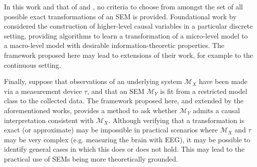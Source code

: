 In this work and that of \cite{beckers2019approximate} and \cite{beckers2019abstracting},
no criteria to choose from amongst the set of all possible exact transformations of an SEM is provided.
Foundational work by \cite{chalupka2015visual,chalupka2016multi} considered the construction of higher-level causal variables in a particular discrete setting,
providing algorithms to learn a transformation of a micro-level model to a macro-level model with desirable information-theoretic properties.
The framework proposed here may lead to extensions of their work, for example to the continuous setting.

Finally, suppose that observations of an underlying system $\mathcal{M}_X$ have been made via a measurement device $\tau$, and that an SEM $\mathcal{M}_Y$ is fit from a restricted model class to the collected data.
The framework proposed here, and extended by the aforementioned works, provides a method to ask whether $\mathcal{M}_Y$ admits a causal interpretation consistent with $\mathcal{M}_X$.
Although verifying that a transformation is exact (or approximate) may be impossible in practical scenarios where $\mathcal{M}_X$ and $\tau$ may be very complex (e.g. measuring the brain with EEG), it may be possible to identify general cases in which this does or does not hold.
This may lead to the practical use of SEMs being more theoretically grounded.








